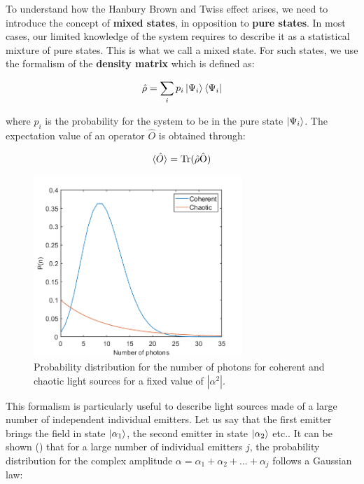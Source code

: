 To understand how the Hanbury Brown and Twiss effect arises, we need to introduce the concept of \textbf{mixed states}, in opposition to \textbf{pure states}. In most cases, our limited knowledge of the system requires to describe it as a statistical mixture of pure states. This is what we call a mixed state. For such states, we use the formalism of the \textbf{density matrix} which is defined as:

\begin{equation}
    \hat{\rho} = \sum_{i} p_i \ket{\Psi_i} \bra{\Psi_i}
\end{equation}

\noindent where $p_i$ is the probability for the system to be in the pure state $\ket{\Psi_i}$. The expectation value of an operator $\hat{O}$ is obtained through:

\begin{equation}
    \langle\hat{O}\rangle = \rm{Tr}(\hat{\rho} \hat{O})
\end{equation}

\begin{figure}
    \centering
    \includegraphics[width=0.7\textwidth]{Fig/Chapter1/coherent_vs_chaotic.png}
    \caption[Probability distribution for the number of photons for coherent and chaotic light sources]{Probability distribution for the number of photons for coherent and chaotic light sources for a fixed value of $|\alpha^2|$.}
    \label{fig:light_statistics}
\end{figure}

This formalism is particularly useful to describe light sources made of a large number of independent individual emitters. Let us say that the first emitter brings the field in state $\ket{\alpha_1}$, the second emitter in state $\ket{\alpha_2}$ etc.. It can be shown (\cite{glauber1963coherent}) that for a large number of individual emitters $j$, the probability distribution for the complex amplitude $\alpha=\alpha_1 + \alpha_2 + ... + \alpha_j$ follows a Gaussian law:

